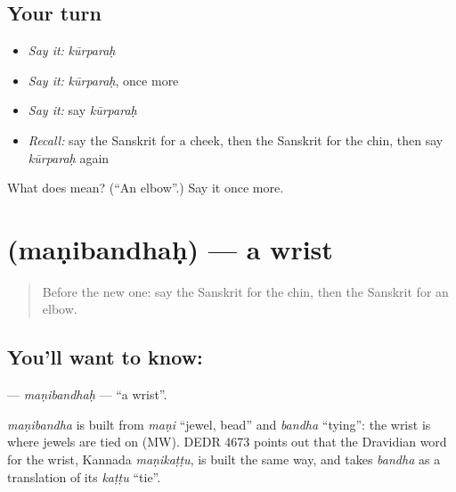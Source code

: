 \subsection*{Your turn}
\begin{itemize}
\raggedright
  \item \emph{Say it:} \emph{kūrparaḥ}
  \item \emph{Say it:} \emph{kūrparaḥ}, once more
  \item \emph{Say it:} say \emph{kūrparaḥ}
  \item \emph{Recall:} say the Sanskrit for a cheek, then the Sanskrit for the chin, then say \emph{kūrparaḥ} again
\end{itemize}

\begin{tcolorbox}[breakable,colback=teal!4,colframe=teal!35!black,title={Before you move on}]
What does  mean? (\textquotedblleft{}An elbow\textquotedblright{}.) Say it once more.
\end{tcolorbox}
\section[\texorpdfstring{\sk{मणिबन्धः} (maṇibandhaḥ)}{मणिबन्धः (maṇibandhaḥ)}]{ (maṇibandhaḥ) — a wrist}

\label{lesson:SA-C116-manibandhah}



\begin{quote}
Before the new one: say the Sanskrit for the chin, then the Sanskrit for an elbow.
\end{quote}

\subsection*{You'll want to know: }
\textbf{} — \emph{maṇibandhaḥ} — \textquotedblleft{}a wrist\textquotedblright{}.

\begin{cousinweb}
\emph{maṇibandha} is built from \emph{maṇi} \textquotedblleft{}jewel, bead\textquotedblright{} and \emph{bandha} \textquotedblleft{}tying\textquotedblright{}: the wrist is where jewels are tied on (MW). DEDR 4673 points out that the Dravidian word for the wrist, Kannada \emph{maṇikaṭṭu}, is built the same way, and takes \emph{bandha} as a translation of its \emph{kaṭṭu} \textquotedblleft{}tie\textquotedblright{}.
\end{cousinweb}


